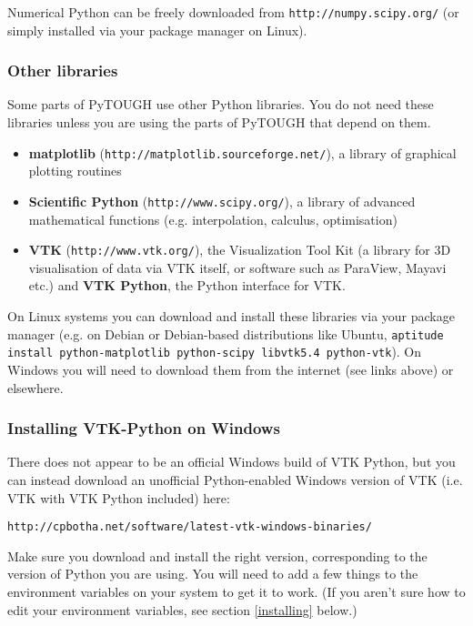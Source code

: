 Numerical Python can be freely downloaded from \texttt{http://numpy.scipy.org/} (or simply installed via your package manager on Linux).

\subsubsection{Other libraries}

Some parts of PyTOUGH use other Python libraries.  You do not need these libraries unless you are using the parts of PyTOUGH that depend on them.

\begin{itemize}
\item \textbf{matplotlib} (\texttt{http://matplotlib.sourceforge.net/}), a library of graphical plotting routines
\item \textbf{Scientific Python} (\texttt{http://www.scipy.org/}), a library of advanced mathematical functions (e.g. interpolation, calculus, optimisation)
\item \textbf{VTK} (\texttt{http://www.vtk.org/}), the Visualization Tool Kit (a library for 3D visualisation of data via VTK itself, or software such as ParaView, Mayavi etc.) and \textbf{VTK Python}, the Python interface for VTK.
\end{itemize}

On Linux systems you can download and install these libraries via your package manager (e.g. on Debian or Debian-based distributions like Ubuntu, \texttt{aptitude install python-matplotlib python-scipy libvtk5.4 python-vtk}).  On Windows you will need to download them from the internet (see links above) or elsewhere.

\subsubsection{Installing VTK-Python on Windows}

There does not appear to be an official Windows build of VTK Python, but you can instead download an unofficial Python-enabled Windows version of VTK (i.e. VTK with VTK Python included) here:

\texttt{http://cpbotha.net/software/latest-vtk-windows-binaries/}

Make sure you download and install the right version, corresponding to the version of Python you are using.  You will need to add a few things to the environment variables on your system to get it to work.  (If you aren't sure how to edit your environment variables, see section \ref{installing} below.) 

